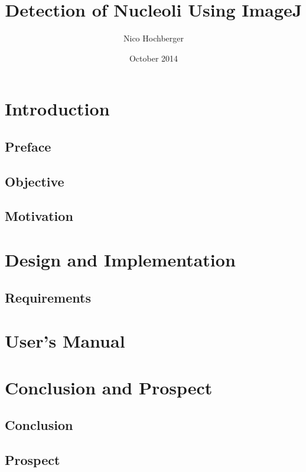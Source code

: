 \documentclass[a4paper, 11pt]{article}
\begin{document}


\title{Detection of Nucleoli Using ImageJ}
\author{Nico Hochberger}
\date{October 2014}
\maketitle

\newpage
\tableofcontents

\newpage
\section{Introduction}

\subsection{Preface}

\subsection{Objective}

\subsection{Motivation}

\newpage
\section{Design and Implementation}

\subsection{Requirements}

\newpage
\section{User's Manual}

\newpage
\section{Conclusion and Prospect}

\subsection{Conclusion}

\subsection{Prospect}


\newpage
{}

\end{document}
